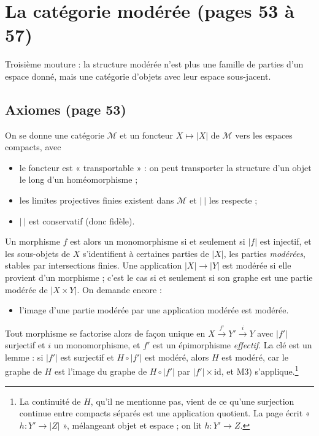 \documentclass[11pt,a4paper]{article}
\begin{document}
\section*{La catégorie modérée (pages 53 à 57)}

Troisième mouture : la structure modérée n'est plus une famille de parties
d'un espace donné, mais une catégorie d'objets avec leur espace sous-jacent.

\subsection*{Axiomes (page 53)}

On se donne une catégorie $\mathcal{M}$ et un foncteur $X \mapsto |X|$ de
$\mathcal{M}$ vers les espaces compacts, avec

\begin{itemize}
\item[M0)] le foncteur est « transportable » : on peut transporter la structure
  d'un objet le long d'un homéomorphisme ;
\item[M1)] les limites projectives finies existent dans $\mathcal{M}$ et
  $|\ |$ les respecte ;
\item[M2)] $|\ |$ est conservatif (donc fidèle).
\end{itemize}

Un morphisme $f$ est alors un monomorphisme si et seulement si $|f|$ est
injectif, et les sous-objets de $X$ s'identifient à certaines parties de
$|X|$, les parties \emph{modérées}, stables par intersections finies. Une
application $|X| \to |Y|$ est modérée si elle provient d'un morphisme ; c'est le
cas si et seulement si son graphe est une partie modérée de $|X \times Y|$. On
demande encore :

\begin{itemize}
\item[M3)] l'image d'une partie modérée par une application modérée est
  modérée.
\end{itemize}

Tout morphisme se factorise alors de façon unique en $X \xrightarrow{f'} Y'
\xrightarrow{i} Y$ avec $|f'|$ surjectif et $i$ un monomorphisme, et $f'$ est
un épimorphisme \emph{effectif}. La clé est un lemme : si $|f'|$ est surjectif
et $H \circ |f'|$ est modéré, alors $H$ est modéré, car le graphe de $H$ est
l'image du graphe de $H \circ |f'|$ par $|f'| \times \mathrm{id}$, et M3)
s'applique.\footnote{La continuité de $H$, qu'il ne mentionne pas, vient de ce
qu'une surjection continue entre compacts séparés est une application
quotient. La page écrit « $h : Y' \to |Z|$ », mélangeant objet et espace ; on
lit $h : Y' \to Z$.}
\end{document}

